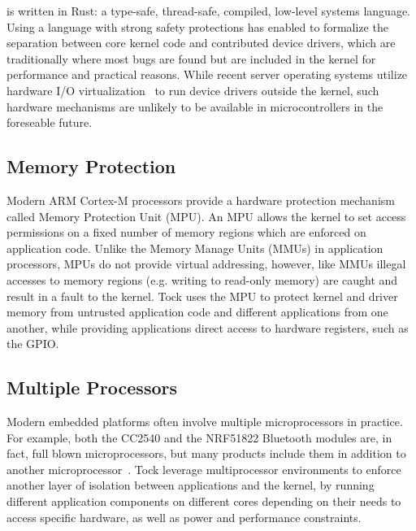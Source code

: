 \name is written in Rust: a type-safe, thread-safe, compiled, low-level systems
language. Using a language with strong safety protections has enabled \name to
formalize the separation between core kernel code and contributed device
drivers, which are traditionally where most bugs are found but are included in
the kernel for performance and practical reasons. While recent server operating
systems utilize hardware I/O virtualization~\cite{arrakis:osdi2014, ix:osdi2014}
to run device drivers outside the kernel, such hardware mechanisms are unlikely
to be available in microcontrollers in the foreseable future.

\subsection{Memory Protection}

Modern ARM Cortex-M processors provide a hardware protection mechanism called
Memory Protection Unit (MPU).  An MPU allows the kernel to set access
permissions on a fixed number of memory regions which are enforced on
application code. Unlike the Memory Manage Units (MMUs) in application
processors, MPUs do not provide virtual addressing, however, like MMUs illegal
accesses to memory regions (e.g. writing to read-only memory) are caught and
result in a fault to the kernel. Tock uses the MPU to protect kernel and driver
memory from untrusted application code and different applications from one
another, while providing applications direct access to hardware registers, such
as the GPIO.

\subsection{Multiple Processors}

Modern embedded platforms often involve multiple microprocessors in practice.
For example, both the CC2540 and the NRF51822 Bluetooth modules are, in fact,
full blown microprocessors, but many products include them in addition to
another microprocessor~. Tock leverage
multiprocessor environments to enforce another layer of isolation between
applications and the kernel, by running different application components on
different cores depending on their needs to access specific hardware, as well as
power and performance constraints.

